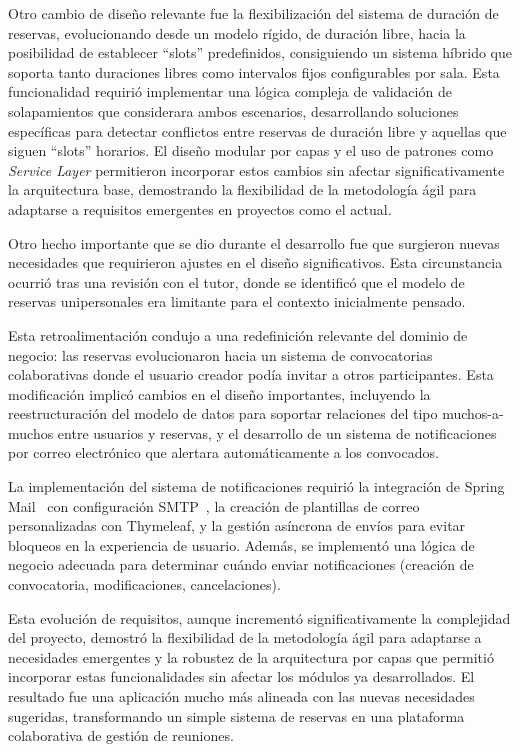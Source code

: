 Otro cambio de diseño relevante fue la flexibilización del sistema de duración de reservas, evolucionando desde un modelo rígido, de duración libre, hacia la posibilidad de establecer ``slots'' predefinidos, consiguiendo un sistema híbrido que soporta tanto duraciones libres como intervalos fijos configurables por sala. Esta funcionalidad requirió implementar una lógica compleja de validación de solapamientos que considerara ambos escenarios, desarrollando soluciones específicas para detectar conflictos entre reservas de duración libre y aquellas que siguen ``slots'' horarios. El diseño modular por capas y el uso de patrones como \emph{Service Layer} permitieron incorporar estos cambios sin afectar significativamente la arquitectura base, demostrando la flexibilidad de la metodología ágil para adaptarse a requisitos emergentes en proyectos como el actual.

Otro hecho importante que se dio durante el desarrollo fue que surgieron nuevas necesidades que requirieron ajustes en el diseño significativos. Esta circunstancia ocurrió tras una revisión con el tutor, donde se identificó que el modelo de reservas unipersonales era limitante para el contexto inicialmente pensado.

Esta retroalimentación condujo a una redefinición relevante del dominio de negocio: las reservas evolucionaron hacia un sistema de convocatorias colaborativas donde el usuario creador podía invitar a otros participantes. Esta modificación implicó cambios en el diseño importantes, incluyendo la reestructuración del modelo de datos para soportar relaciones del tipo muchos-a-muchos entre usuarios y reservas, y el desarrollo de un sistema de notificaciones por correo electrónico que alertara automáticamente a los convocados.

La implementación del sistema de notificaciones requirió la integración de Spring Mail~\cite{spring-mail} con configuración SMTP~\cite{smtp}, la creación de plantillas de correo personalizadas con Thymeleaf, y la gestión asíncrona de envíos para evitar bloqueos en la experiencia de usuario. Además, se implementó una lógica de negocio adecuada para determinar cuándo enviar notificaciones (creación de convocatoria, modificaciones, cancelaciones).

Esta evolución de requisitos, aunque incrementó significativamente la complejidad del proyecto, demostró la flexibilidad de la metodología ágil para adaptarse a necesidades emergentes y la robustez de la arquitectura por capas que permitió incorporar estas funcionalidades sin afectar los módulos ya desarrollados. El resultado fue una aplicación mucho más alineada con las nuevas necesidades sugeridas, transformando un simple sistema de reservas en una plataforma colaborativa de gestión de reuniones.

